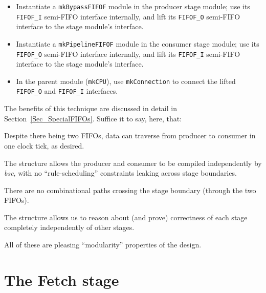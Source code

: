 \begin{itemize}

 \item Instantiate a {\tt mkBypassFIFOF} module in the producer stage
       module; use its {\tt FIFOF\_I} semi-FIFO interface internally,
       and lift its {\tt FIFOF\_O} semi-FIFO interface to the stage
       module's interface.

 \item Instantiate a {\tt mkPipelineFIFOF} module in the consumer stage
       module; use its {\tt FIFOF\_O} semi-FIFO interface internally,
       and lift its {\tt FIFOF\_I} semi-FIFO interface to the stage
       module's interface.

 \item In the parent module ({\tt mkCPU}), use {\tt mkConnection} to
       connect the lifted {\tt FIFOF\_O} and {\tt FIFOF\_I}
       interfaces.

\end{itemize}

The benefits of this technique are discussed in detail in
Section~\ref{Sec_SpecialFIFOs}.  Suffice it to say, here, that:

\begin{tightlist}

 \item Despite there being two FIFOs, data can traverse from producer
       to consumer in one clock tick, as desired.

 \item The structure allows the producer and consumer to be compiled
       independently by \emph{bsc}, with no ``rule-scheduling''
       constraints leaking across stage boundaries.

 \item There are no combinational paths crossing the stage boundary
       (through the two FIFOs).

 \item The structure allows us to reason about (and prove) correctness
       of each stage completely independently of other stages.

\end{tightlist}
All of these are pleasing ``modularity'' properties of the design.


\section{The Fetch stage}

